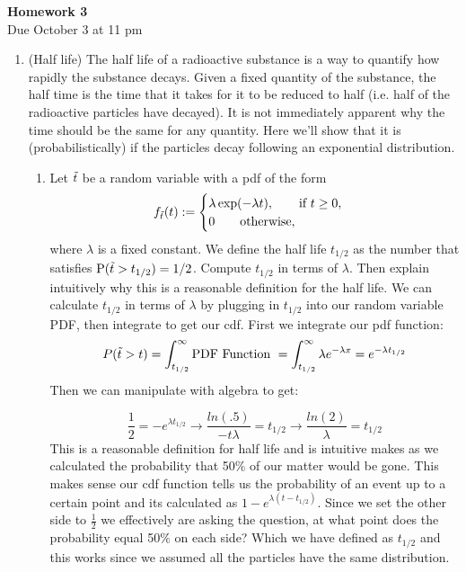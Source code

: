 \documentclass[12pt,twoside]{article}
\begin{document}
\begin{center}
{\large{\textbf{Homework 3}} } \vspace{0.2cm}\\
Due October 3 at 11 pm
\\
\end{center}

\begin{enumerate}

\item (Half life)
The half life of a radioactive substance is a way to quantify how rapidly the substance decays. Given a fixed quantity of the substance, the half time is the time that it takes for it to be reduced to half (i.e. half of the radioactive particles have decayed). It is not immediately apparent why the time should be the same for any quantity. Here we'll show that it is (probabilistically) if the particles decay following an exponential distribution.  
\begin{enumerate}
\item Let $\tilde{ t }$ be a random variable with a pdf of the form
\begin{align}
f_{\tilde{ t }}(t) := \begin{cases}
\lambda \exp(- \lambda t), \qquad \text{if $t\geq 0$},\\
0 \qquad \text{otherwise},
\end{cases}
\end{align}
where $\lambda$ is a fixed constant. We define the half life $t_{1/2}$ as the number that satisfies $\mathrm{P}(\tilde{ t } > t_{1/2}) = 1/2$. Compute $t_{1/2}$ in terms of $\lambda$. Then explain intuitively why this is a reasonable definition for the half life.
\subitem 
We can calculate $t_{1/2}$ in terms of $\lambda$ by plugging in $t_{1/2}$ into our random variable PDF, then integrate to get our cdf. First we integrate our pdf function:
$$
    P(\tilde{ t } > t) = \int_{t_{1/2}}^\infty \text{PDF Function } = \int_{t_{1/2}}^\infty \lambda e^{-\lambda x}   = e^{-\lambda t_{1/2}}
$$Then we can manipulate with algebra to get: 

$$\frac{1}{2}= -e^{\lambda t_{1/2}} \rightarrow  \frac{ln(.5)}{-t\lambda} = t_{1/2}   \rightarrow \frac{ln(2)}{\lambda} = t_{1/2}     $$ 
This is a reasonable definition for half life and is intuitive makes as we calculated the probability that 50$\%$ of our matter would be gone. This makes sense our cdf function tells us the probability of an event up to a certain point and its calculated as $1-e^{\lambda (t-t_{1/2})}$. Since we set the other side to $\frac{1}{2}$ we effectively are asking the question, at what point does the probability equal 50$\%$ on each side? Which we have defined as $t_{1/2}$ and this works since we assumed all the particles have the same distribution. 


\end{enumerate}
\end{enumerate}
\end{document}
